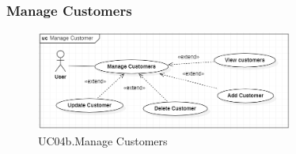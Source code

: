 \documentclass[../thesis.tex]{subfiles}
\begin{document}
\subsubsection{Manage Customers}
\begin{figure}[H]
    \centering
    \includegraphics[width=0.75\textwidth]{images/UCD_ManageCustomers.png}
    \caption{UC04b.Manage Customers}
    \label{fig:UCD-manage-customers}
\end{figure}
\end{document}

